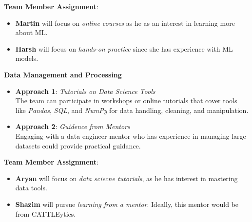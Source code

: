 \documentclass[12pt]{article}
\begin{document}
\textbf{Team Member Assignment}:
\begin{itemize}
    \item \textbf{Martin} will focus on \textit{online courses} as he as an 
    interest in learning more about ML.
    \item \textbf{Harsh} will focus on \textit{hands-on practice} since she has 
    experience with ML models.
\end{itemize}

\textbf{Data Management and Processing}

\begin{itemize}
    \item \textbf{Approach 1}: \textit{Tutorials on Data Science Tools} \\
    The team can participate in workshops or online tutorials that cover tools 
    like \textit{Pandas}, \textit{SQL}, and \textit{NumPy} for data handling, 
    cleaning, and manipulation.
    \item \textbf{Approach 2}: \textit{Guidence from Mentors} \\
    Engaging with a data engineer mentor who has experience in managing large 
    datasets could provide practical guidance. 
\end{itemize}

\textbf{Team Member Assignment}:
\begin{itemize}
    \item \textbf{Aryan} will focus on \textit{data sciecne tutorials}, as he 
    has interest in mastering data tools.
    \item \textbf{Shazim} will pursue \textit{learning from a mentor}. Ideally, 
    this mentor would be from CATTLEytics.
\end{itemize}
\end{document}
